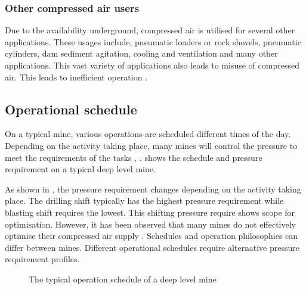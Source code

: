 \subsubsection{Other compressed air users}
Due to the availability underground, compressed air is utilised for several other applications. These usages include, pneumatic loaders or rock shovels, pneumatic cylinders, dam sediment agitation, cooling and ventilation and many other applications. This vast variety of applications also leads to misuse of compressed air. This leads to inefficient operation  \cite{Marais2012PhD}.
\subsection{Operational schedule}
On a typical mine, various operations are scheduled different times of the day. Depending on the activity taking place, many mines will control the pressure to meet the requirements of the tasks \cite{Marais2012PhD}, \cite{Kriel2014Masters}.  shows the schedule and pressure requirement on a typical deep level mine.
\par 
As shown in , the pressure requirement changes depending on the activity taking place. The drilling shift typically has the highest pressure requirement while blasting shift requires the lowest. This shifting pressure require shows scope for optimisation. However, it has been observed that many mines do not effectively optimise their compressed air supply \cite{padachi2009energy}.
Schedules and operation philosophies can differ between mines. Different operational schedules require alternative pressure requirement profiles.
\par 
\begin{figure}[h]
	\centering
	\fbox{}
	\caption[A typical operation schedule of a deep level mine]{The typical operation schedule of a deep level mine \cite{Kriel2014Masters}}
	\label{fig: Mining schedule}
\end{figure}
